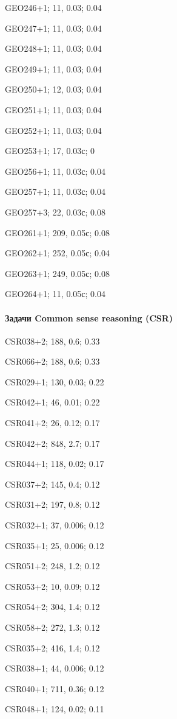 GEO246+1; 11, 0.03; 0.04

GEO247+1; 11, 0.03; 0.04

GEO248+1; 11, 0.03; 0.04

GEO249+1; 11, 0.03; 0.04

GEO250+1; 12, 0.03; 0.04

GEO251+1; 11, 0.03; 0.04

GEO252+1; 11, 0.03; 0.04

GEO253+1; 17, 0.03с; 0

GEO256+1; 11, 0.03с; 0.04

GEO257+1; 11, 0.03с; 0.04

GEO257+3; 22, 0.03с; 0.08

GEO261+1; 209, 0.05с; 0.08

GEO262+1; 252, 0.05с; 0.04

GEO263+1; 249, 0.05с; 0.08

GEO264+1; 11, 0.05с; 0.04

\paragraph{Задачи Common sense reasoning (CSR)}

CSR038+2; 188, 0.6; 0.33

CSR066+2; 188, 0.6; 0.33

CSR029+1; 130, 0.03; 0.22

CSR042+1; 46, 0.01; 0.22

CSR041+2; 26, 0.12; 0.17

CSR042+2; 848, 2.7; 0.17

CSR044+1; 118, 0.02; 0.17

CSR037+2; 145, 0.4; 0.12

CSR031+2; 197, 0.8; 0.12

CSR032+1; 37, 0.006; 0.12

CSR035+1; 25, 0.006; 0.12

CSR051+2; 248, 1.2; 0.12

CSR053+2; 10, 0.09; 0.12

CSR054+2; 304, 1.4; 0.12

CSR058+2; 272, 1.3; 0.12



CSR035+2; 416, 1.4; 0.12

CSR038+1; 44, 0.006; 0.12

CSR040+1; 711, 0.36; 0.12

CSR048+1; 124, 0.02; 0.11

